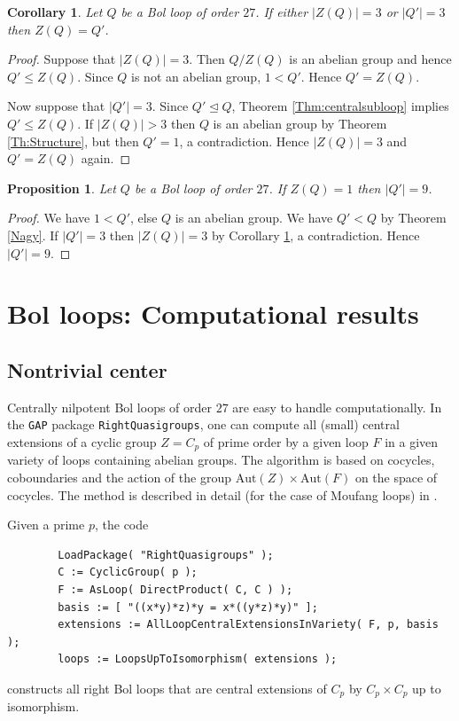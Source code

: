 \documentclass[12pt,reqno]{amsart}
\numberwithin{equation}{section}
\theoremstyle{plain}
\newtheorem{corollary}[theorem]{Corollary}
\newtheorem{proposition}[theorem]{Proposition}
\theoremstyle{definition}
\newcommand{\aut}[1]{\mathrm{Aut}(#1)}
\begin{document}
\begin{corollary}\label{Cr:Likewise}
Let $Q$ be a Bol loop of order $27$. If either $|Z(Q)|=3$ or $|Q'|=3$ then $Z(Q)=Q'$.
\end{corollary}
\begin{proof}
Suppose that $|Z(Q)|=3$. Then $Q/Z(Q)$ is an abelian group and hence $Q'\le Z(Q)$. Since $Q$ is not an abelian group, $1<Q'$. Hence $Q'=Z(Q)$.

Now suppose that $|Q'|=3$. Since $Q'\unlhd Q$, Theorem \ref{Thm:centralsubloop} implies $Q'\le Z(Q)$. If $|Z(Q)|>3$ then $Q$ is an abelian group by Theorem \ref{Th:Structure}, but then $Q'=1$, a contradiction. Hence $|Z(Q)|=3$ and $Q'=Z(Q)$ again.
\end{proof}

\begin{proposition}\label{Pr:LargeDerived}
Let $Q$ be a Bol loop of order $27$. If $Z(Q)=1$ then $|Q'|=9$.
\end{proposition}
\begin{proof}
We have $1<Q'$, else $Q$ is an abelian group. We have $Q'<Q$ by Theorem \ref{Nagy}. If $|Q'|=3$ then $|Z(Q)|=3$ by Corollary \ref{Cr:Likewise}, a contradiction. Hence $|Q'|=9$.
\end{proof}

\section{Bol loops: Computational results}

\subsection{Nontrivial center}

Centrally nilpotent Bol loops of order $27$ are easy to handle computationally. In the \texttt{GAP} package \texttt{RightQuasigroups}, one can compute all (small) central extensions of a cyclic group $Z=C_p$ of prime order by a given loop $F$ in a given variety of loops containing abelian groups. The algorithm is based on cocycles, coboundaries and the action of the group $\aut{Z}\times\aut{F}$ on the space of cocycles. The method is described in detail (for the case of Moufang loops) in \cite{NV64}.

Given a prime $p$, the code
\begin{verbatim}
        LoadPackage( "RightQuasigroups" );
        C := CyclicGroup( p );
        F := AsLoop( DirectProduct( C, C ) );
        basis := [ "((x*y)*z)*y = x*((y*z)*y)" ];
        extensions := AllLoopCentralExtensionsInVariety( F, p, basis );
        loops := LoopsUpToIsomorphism( extensions );
\end{verbatim}
constructs all right Bol loops that are central extensions of $C_p$ by $C_p\times C_p$ up to isomorphism.
\end{document}
